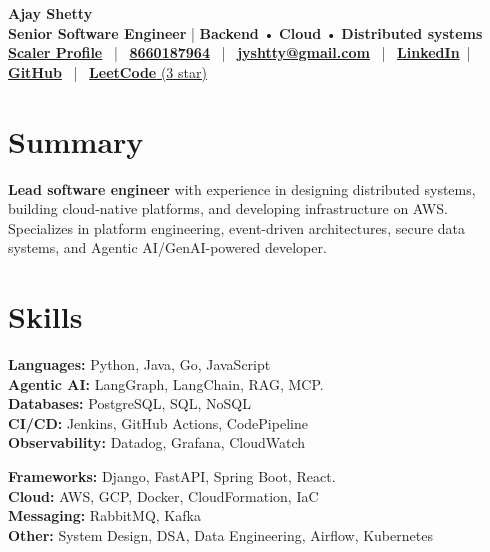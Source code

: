 \documentclass[11 pt]{article}
\begin{document}
\begin{center}
    {\LARGE \textbf{Ajay Shetty}} \\[4pt]
    \textbf{Senior Software Engineer} | \textbf{Backend} • \textbf{Cloud} • \textbf{ Distributed systems} \\[6pt]

    \href{https://www.scaler.com/academy/profile/e30cd4a603ce/}{\textbf{Scaler Profile}} \, | \,
    \href{tel:8660187964}{\textbf{8660187964}} \, | \,
    \href{mailto:jyshtty@gmail.com}{\textbf{jyshtty@gmail.com}} \, | \,
    \href{https://www.linkedin.com/in/ajay-shetty-2b5901ab/}{\textbf{LinkedIn}} \,|\,
    \href{https://github.com/jyshtty}{\textbf{GitHub}} \, | \,
    \href{https://leetcode.com/u/jyshtty/}{\textbf{LeetCode} (3 star)}
\end{center}

\section*{\textbf{Summary}}
\textbf{Lead software engineer}  with experience in designing distributed systems, building cloud-native platforms, and developing infrastructure on AWS. Specializes in platform engineering, event-driven architectures, secure data systems, and Agentic AI/GenAI-powered developer.



\section*{\textbf{Skills}}

\noindent
\begin{minipage}[t]{0.48\textwidth}
\textbf{Languages:} Python, Java, Go, JavaScript \\[1pt]
\textbf{Agentic AI:} LangGraph, LangChain, RAG, MCP. \\[1pt]
\textbf{Databases:} PostgreSQL, SQL, NoSQL \\[1pt]
\textbf{CI/CD:} Jenkins, GitHub Actions, CodePipeline \\[1pt]
\textbf{Observability:} Datadog, Grafana, CloudWatch
\end{minipage}
\hfill
\begin{minipage}[t]{0.48\textwidth}
\textbf{Frameworks:} Django, FastAPI, Spring Boot, React.  \\[1pt]
\textbf{Cloud:} AWS, GCP, Docker, CloudFormation, IaC \\[1pt]
\textbf{Messaging:} RabbitMQ, Kafka \\[1pt]
\textbf{Other:} System Design, DSA, Data Engineering, Airflow, Kubernetes
\end{minipage}
\end{document}
